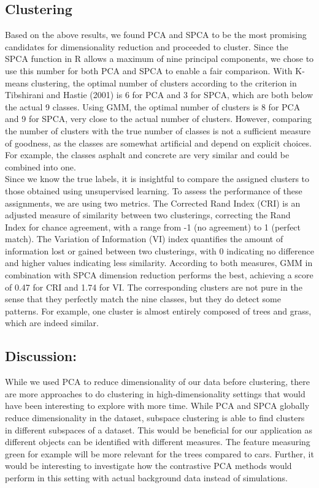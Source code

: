 \documentclass[11pt]{article}
\begin{document}
\subsection{Clustering}

Based on the above results, we found PCA and SPCA to be the most promising candidates for dimensionality reduction and proceeded to cluster. Since the SPCA function in R allows a maximum of nine principal components, we chose to use this number for both PCA and SPCA to enable a fair comparison. With K-means clustering, the optimal number of clusters according to the criterion in Tibshirani and Hastie (2001) is 6 for PCA and 3 for SPCA, which are both below the actual 9 classes. Using GMM, the optimal number of clusters is 8 for PCA and 9 for SPCA, very close to the actual number of clusters. However, comparing the number of clusters with the true number of classes is not a sufficient measure of goodness, as the classes are somewhat artificial and depend on explicit choices. For example, the classes asphalt and concrete are very similar and could be combined into one.\\

Since we know the true labels, it is insightful to compare the assigned clusters to those obtained using unsupervised learning. To assess the performance of these assignments, we are using two metrics. The Corrected Rand Index (CRI) is an adjusted measure of similarity between two clusterings, correcting the Rand Index for chance agreement, with a range from -1 (no agreement) to 1 (perfect match). The Variation of Information (VI) index quantifies the amount of information lost or gained between two clusterings, with 0 indicating no difference and higher values indicating less similarity. According to both measures, GMM in combination with SPCA dimension reduction performs the best, achieving a score of 0.47 for CRI and 1.74 for VI. The corresponding clusters are not pure in the sense that they perfectly match the nine classes, but they do detect some patterns. For example, one cluster is almost entirely composed of trees and grass, which are indeed similar.

\subsection{Discussion:}
While we used PCA to reduce dimensionality of our data before clustering, there are more approaches to do clustering in high-dimensionality settings that would have been interesting to explore with more time. While PCA and SPCA globally reduce dimensionality in the dataset, subspace clustering is able to find clusters in different subspaces of a dataset. This would be beneficial for our application as different objects can be identified with different measures. The feature measuring green for example will be more relevant for the trees compared to cars. Further, it would be interesting to investigate how the contrastive PCA methods would perform in this setting with actual background data instead of simulations.
\end{document}

